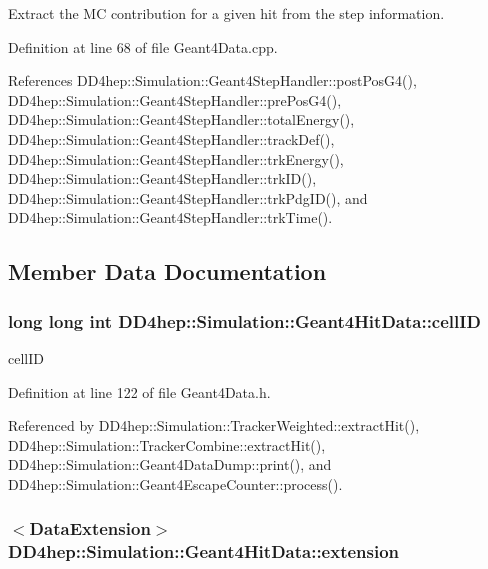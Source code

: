 Extract the MC contribution for a given hit from the step information. 

Definition at line 68 of file Geant4Data.cpp.

References DD4hep::Simulation::Geant4StepHandler::postPosG4(), DD4hep::Simulation::Geant4StepHandler::prePosG4(), DD4hep::Simulation::Geant4StepHandler::totalEnergy(), DD4hep::Simulation::Geant4StepHandler::trackDef(), DD4hep::Simulation::Geant4StepHandler::trkEnergy(), DD4hep::Simulation::Geant4StepHandler::trkID(), DD4hep::Simulation::Geant4StepHandler::trkPdgID(), and DD4hep::Simulation::Geant4StepHandler::trkTime().

\subsection{Member Data Documentation}
\hypertarget{class_d_d4hep_1_1_simulation_1_1_geant4_hit_data_a3ad003b720e4d7a1c6e66e0eabb58540}{
\subsubsection[{cellID}]{\setlength{\rightskip}{0pt plus 5cm}long long int {\bf DD4hep::Simulation::Geant4HitData::cellID}}}
\label{class_d_d4hep_1_1_simulation_1_1_geant4_hit_data_a3ad003b720e4d7a1c6e66e0eabb58540}


cellID 

Definition at line 122 of file Geant4Data.h.

Referenced by DD4hep::Simulation::TrackerWeighted::extractHit(), DD4hep::Simulation::TrackerCombine::extractHit(), DD4hep::Simulation::Geant4DataDump::print(), and DD4hep::Simulation::Geant4EscapeCounter::process().\hypertarget{class_d_d4hep_1_1_simulation_1_1_geant4_hit_data_a56ce0428b9799cf18cab288a77c6e3c5}{
\subsubsection[{extension}]{$<${\bf DataExtension}$>$ {\bf DD4hep::Simulation::Geant4HitData::extension}}}
\label{class_d_d4hep_1_1_simulation_1_1_geant4_hit_data_a56ce0428b9799cf18cab288a77c6e3c5}


